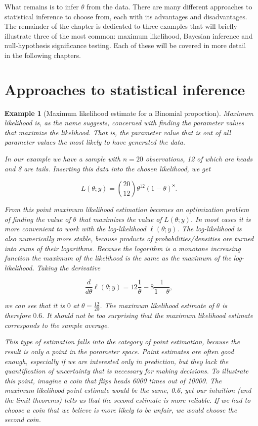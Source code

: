 \documentclass{book}
\theoremstyle{plain}%
\newtheorem{prototheorem}{Example}[section]
\newenvironment{cexample}
   {\colorlet{shadecolor}{gray!10}\begin{shaded}\begin{prototheorem}}
   {\end{prototheorem}\end{shaded}}
\theoremstyle{definition}
\begin{document}
What remains is to infer $\theta$ from the data. There are many different approaches to statistical inference to choose from, each with its advantages and disadvantages. The remainder of the chapter is dedicated to three examples that will briefly illustrate three of the most common: maximum likelihood, Bayesian inference and null-hypothesis significance testing. Each of these will be covered in more detail in the following chapters.

\section{Approaches to statistical inference}

\begin{cexample}[Maximum likelihood estimate for a Binomial proportion]
Maximum likelihood is, as the name suggests, concerned with finding the parameter values that maximize the likelihood. That is, the parameter value that is out of all parameter values the most likely to have generated the data.

In our example we have a sample with $n = 20$ observations, 12 of which are heads and 8 are tails. Inserting this data into the chosen likelihood, we get

$$L(\theta;y) = {20 \choose 12} \theta^{12}(1-\theta)^{8}.$$

From this point maximum likelihood estimation becomes an optimization problem of finding the value of $\theta$ that maximizes the value of $L(\theta;y)$. In most cases it is more convenient to work with the log-likelihood $\ell(\theta;y)$. The log-likelihood is also numerically more stable, because products of probabilities/densities are turned into sums of their logarithms. Because the logarithm is a monotone increasing function the maximum of the likelihood is the same as the maximum of the log-likelihood. Taking the derivative

$$\frac{d}{d\theta} \ell(\theta;y) = 12 \frac{1}{\theta} - 8 \frac{1}{1-\theta},$$

we can see that it is $0$ at $\theta = \frac{12}{20}$. The maximum likelihood estimate of $\theta$ is therefore $0.6$. It should not be too surprising that the maximum likelihood estimate corresponds to the sample average.

This type of estimation falls into the category of \textit{point estimation}, because the result is only a point in the parameter space. Point estimates are often good enough, especially if we are interested only in prediction, but they lack the quantification of uncertainty that is necessary for making decisions. To illustrate this point, imagine a coin that flips heads 6000 times out of 10000. The maximum likelihood point estimate would be the same, 0.6, yet our intuition (and the limit theorems) tells us that the second estimate is more reliable. If we had to choose a coin that we believe is more likely to be unfair, we would choose the second coin.


\end{cexample}
\end{document}
